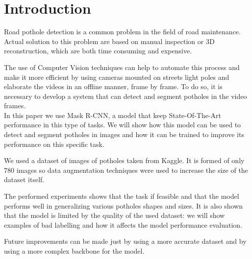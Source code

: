 \chapter{Introduction}


Road pothole detection is a common problem in the field of road maintenance. Actual solution to this problem are based on manual inspection or 3D reconstruction, which are both time consuming and expensive. 

The use of Computer Vision techniques can help to automate this process and make it more efficient by using cameras mounted on streets light poles and elaborate the videos in an offline manner, frame by frame.
To do so, it is necessary to develop a system that can detect and segment potholes in the video frames.\\

In this paper we use Mask R-CNN, a model that keep State-Of-The-Art performance in this type of tasks. We will show how this model can be used to detect and segment potholes in images and how it can be trained to improve its performance on this specific task.

We used a dataset of images of potholes taken from Kaggle. It is formed of only 780 images so data augmentation techniques were used to increase the size of the dataset itself. 

The performed experiments shows that the task if feasible and that the model performs well in generalizing various potholes shapes and sizes. It is also shown that the model is limited by the quality of the used dataset: we will show examples of bad labelling and how it affects the model performance evaluation.

Future improvements can be made just by using a more accurate dataset and by using a more complex backbone for the model.

